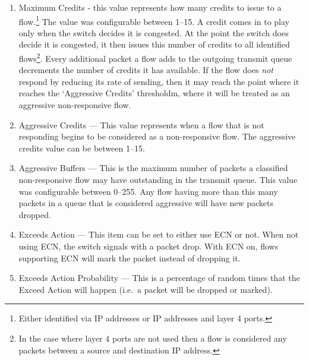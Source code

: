 \documentclass[12pt]{article}
\begin{document}
\begin{enumerate}

\item Maximum Credits - this value represents how many credits to issue to a
flow.\footnote{Either identified via IP addresses or IP addresses and layer 4 ports.}
The value was configurable between 1--15. A credit comes in to play only when
the switch decides it is congested. At the point the switch does decide it is
congested, it then issues this number of credits to all identified flows\footnote{In the
case where layer 4 ports are not used then a flow is considered any packets between
a source and destination IP address.}. Every additional packet a flow adds to the outgoing
transmit queue decrements the number of credits it has available. If the flow does \emph{not}
respond by reducing its rate of sending, then it may reach the point where it reaches the `Aggressive
Credits' thresholdm, where it will be treated as an aggressive non-responsive flow.


\item Aggressive Credits --- This value represents when a flow that is not responding begins
to be considered as a non-responsive flow. The aggressive credits value
can be between 1--15.

\item Aggressive Buffers --- This is the maximum number of packets a classified non-responsive
flow may have outstanding in the transmit queue. This value was configurable  between 0--255.
Any flow having more than this many packets in a queue that is considered aggressive will have
new packets dropped.

\item Exceeds Action --- This item can be set to either use ECN or not. When not
using ECN, the switch signals with a packet drop. With ECN on, flows supporting
ECN will mark the packet instead of dropping it.

\item Exceeds Action Probability --- This is a percentage of random times that the Exceed
Action will happen (i.e.~a packet will be dropped or marked).

\end{enumerate}
\end{document}
